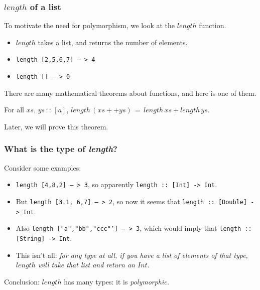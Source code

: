 \documentclass{beamer}
\begin{document}
\begin{frame}[fragile]
\frametitle{$length$ of a list}

To motivate the need for polymorphism, we look at the $length$
function.

\begin{itemize}
\item $length$ takes a list, and returns the number of elements.
\item {\tt length [2,5,6,7] -- > 4}
\item {\tt length [] -- > 0}
\end{itemize}

There are many mathematical theorems about  functions, and
here is one of them.

\begin{theorem}
  For all $xs, \,ys\, ::\, [a]$, $length\, (xs++ys)\, =\, length\,  xs + length\,ys$.
\end{theorem}

Later, we will prove this theorem.

\end{frame}

\begin{frame}[fragile]
\frametitle{What is the type of \emph{length}?}

Consider some examples:

\begin{itemize}
\item \texttt{length [4,8,2] -- > 3}, so apparently {\tt length :: [Int] -> Int}.
\item But \texttt{length [3.1, 6,7] -- > 2}, so now it seems that {\tt length ::
  [Double] -> Int}.
\item Also \texttt{length ["a","bb","ccc"'] -- > 3}, which would imply that
  {\tt length :: [String] -> Int}.
\item This isn't all: \emph{for any type at all, if you have a list
    of elements of that type, $length$ will take that list and
    return an $Int$}.
\end{itemize}

{\redtext Conclusion: $length$ has many types: it is
  \emph{polymorphic.}}

\end{frame}
\end{document}
